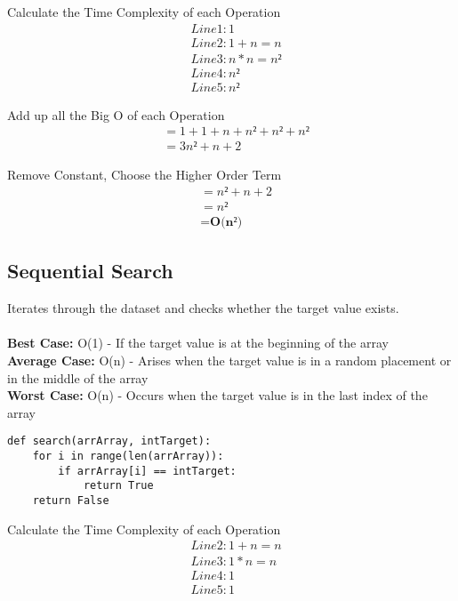 \documentclass{article}
\begin{document}
Calculate the Time Complexity of each Operation
\begin{align*}
    &\text{} Line 1: 1  \\
    &\text{} Line 2: 1 + n = n  \\
    &\text{} Line 3: n * n = n²  \\
    &\text{} Line 4: n² \\
    &\text{} Line 5: n²
\end{align*}

Add up all the Big O of each Operation
\begin{align*}
    &\text{} = 1 + 1 + n + n² + n² + n² \\
    &\text{} = 3n² + n + 2
\end{align*}

Remove Constant, Choose the Higher Order Term
\begin{align*}
    &\text{} = n² + n + 2\\
    &\text{} = n² \\
    &\text{} = \textbf{O(n²)}
\end{align*}


\subsection{Sequential Search}
Iterates through the dataset and checks whether the target value exists.\\
\\
\textbf{Best Case:} O(1) - If the target value is at the beginning of the array\\
\textbf{Average Case:} O(n) - Arises when the target value is in a random placement or in the middle of the array\\
\textbf{Worst Case:} O(n) - Occurs when the target value is in the last index of the array

\begin{verbatim}
def search(arrArray, intTarget):
    for i in range(len(arrArray)):
        if arrArray[i] == intTarget:
            return True
    return False
\end{verbatim}

Calculate the Time Complexity of each Operation
\begin{align*}
    &\text{} Line 2: 1 + n = n  \\
    &\text{} Line 3: 1 * n = n  \\
    &\text{} Line 4: 1 \\
    &\text{} Line 5: 1
\end{align*}
\end{document}
